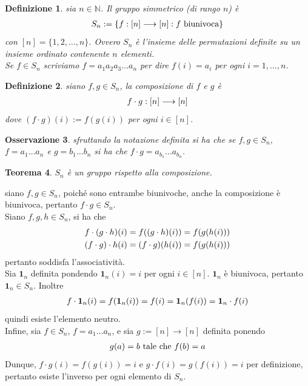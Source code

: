 \documentclass[oneside, 11pt]{amsbook}
\makeatletter
\newcommand{\0}{{(0)}}
\newcommand{\3}{{(3)}}
\theoremstyle{colonplain}
\newtheorem{thm}{Teorema}[chapter]
\theoremstyle{colondefinition}
\newtheorem{defn}[thm]{Definizione}
\theoremstyle{colonremark}
\newtheorem{rmk}[thm]{Osservazione}
\numberwithin{equation}{chapter}
\renewcommand{\proofname}{Dimostrazione}
\renewenvironment{proof}[1][\proofname]{\par
  \pushQED{\qed}%
  \normalfont \topsep6\p@\@plus6\p@\relax
  \trivlist
  \item[\hskip\labelsep\bfseries #1:]\ignorespaces
}{%
  \popQED\endtrivlist\@endpefalse
}
\makeatother
\begin{document}
\begin{defn}
sia $n \in \mathbb{N}$. Il gruppo simmetrico (di rango $n$) è
\begin{align}
    S_n := \{ f : [n] \longrightarrow [n] : f \text{ biunivoca} \} \notag
\end{align}
con $[n] = \{1, 2, \dots, n \}$. Ovvero $S_n$ è l'insieme delle permutazioni definite su un insieme ordinato contenente $n$ elementi. \\
Se $f \in S_n$ scriviamo $f = a_1a_2a_3 \dots a_n$ per dire $f(i) = a_i$ per ogni $i = 1, \dots, n$.
\end{defn}
\begin{defn}
siano $f, g \in S_n$, la composizione di $f$ e $g$ è
\begin{align}
    f \cdot g : [n] \longrightarrow [n] \notag
\end{align}
dove $(f \cdot g) (i) := f(g(i))$ per ogni $i \in [n]$.
\end{defn}
\begin{rmk}
sfruttando la notazione definita si ha che se $f, g \in S_n$, \\ $f = a_1 \dots a_n$ e $g = b_1 \dots b_n$ si ha che $f \cdot g = a_{b_1} \dots a_{b_n}$.
\end{rmk}
\begin{thm}
$S_n$ è un gruppo rispetto alla composizione.
\end{thm}
\begin{proof} 
siano $f, g \in S_n$, poiché sono entrambe biunivoche, anche la composizione è biunivoca, pertanto $f \cdot g \in S_n$. \\
Siano $f, g, h \in S_n$, si ha che
\begin{align}
    f \cdot (g \cdot h)(i) = f((g \cdot h)(i)) = f(g(h(i))) \notag \\
    (f \cdot g) \cdot h(i) = (f \cdot g)(h(i)) = f(g(h(i))) \notag
\end{align}
pertanto soddisfa l'associatività. \\
Sia $\mathbf{1}_n$ definita pondendo $\mathbf{1}_n(i) = i$ per ogni $i \in [n]$. $\mathbf{1}_n$ è biunivoca, pertanto $\mathbf{1}_n \in S_n$. Inoltre
\begin{align}
    f \cdot \mathbf{1}_n (i) = f(\mathbf{1}_n(i)) = f(i) = \mathbf{1}_n (f(i)) = \mathbf{1}_n \cdot f (i) \notag
\end{align}
quindi esiste l'elemento neutro. \\
Infine, sia $f \in S_n$, $f = a_1 \dots a_n$, e sia $g := [n] \longrightarrow [n]$ definita ponendo
\begin{align}
    g(a) = b \text{ tale che } f(b) = a \notag
\end{align}
Dunque, $f \cdot g (i) = f(g(i)) = i$ e $g \cdot f (i) = g(f(i)) = i$ per definizione, pertanto esiste l'inverso per ogni elemento di $S_n$.
\end{proof}
\end{document}

